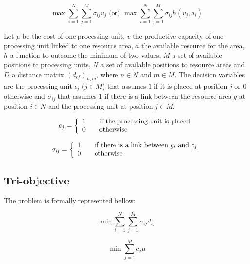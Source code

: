 \documentclass{llncs}
\begin{document}
\begin{equation}
\max \sum\limits_{i=1}^{N} \sum\limits_{j=1}^{M} \sigma_{ij}v_j
\text{  (or)  }
\max \sum\limits_{i=1}^{N} \sum\limits_{j=1}^{M} \sigma_{ij}h(v_j, a_i)
\end{equation}

Let $\mu$ be the cost of one processing  unit, $v$ the productive capacity of one processing unit linked to one resource area, $a$ the  available resource for the area, $h$ a function to outcome the minimum of two values, $M$ a set of available positions to processing units, $N$ a set of available positions to resource areas and $D$ a distance matrix $(d_{ef})_{n_{x}m}$, where $n \in N$ and $m \in M$. The decision variables are the processing unit $c_j$ ($j \in M$) that assumes $1$ if it is placed at position $j$ or $0$ otherwise and $\sigma_{ij}$ that assumes $1$ if there is a link between the resource area $g$ at position $i \in N$ and the processing unit at position $j \in M$. 



\begin{equation}
 c_j = \left\{
  \begin{array}{l l}
    1 & \quad \text{if the processing unit is placed}\\
    0 & \quad \text{otherwise}
  \end{array} \right.
\end{equation}

\begin{equation}
 \sigma_{ij} = \left\{
  \begin{array}{l l}
    1 & \quad \text{if there is a link between }g_i \text{ and }c_j\\
    0 & \quad \text{otherwise}
  \end{array} \right.
\end{equation}

\subsection{Tri-objective}

The problem is formally represented bellow: 


\begin{equation}
\min \sum\limits_{i=1}^{N} \sum\limits_{j=1}^{M} \sigma_{ij}d_{ij} 
\end{equation}


\begin{equation}
\min \sum\limits_{j=1}^{M}c_j\mu
\end{equation}
\end{document}
